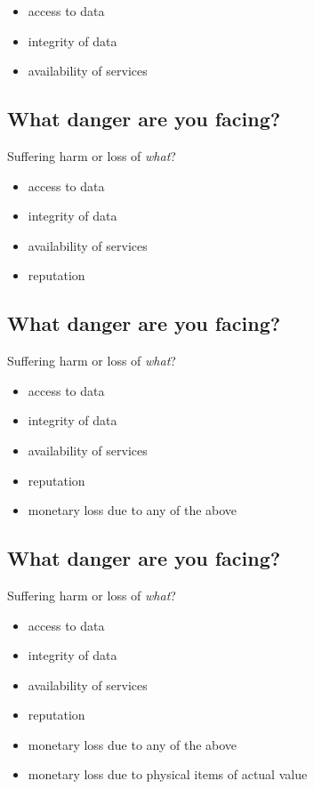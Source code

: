 \documentclass[xga]{xdvislides}
\begin{document}
\begin{itemize}
	\item access to data
	\item integrity of data
	\item availability of services
\end{itemize}

\subsection{What danger are you facing?}
Suffering harm or loss of {\em what}?

\begin{itemize}
	\item access to data
	\item integrity of data
	\item availability of services
	\item reputation
\end{itemize}

\subsection{What danger are you facing?}
Suffering harm or loss of {\em what}?

\begin{itemize}
	\item access to data
	\item integrity of data
	\item availability of services
	\item reputation
	\item monetary loss due to any of the above
\end{itemize}

\subsection{What danger are you facing?}
Suffering harm or loss of {\em what}?

\begin{itemize}
	\item access to data
	\item integrity of data
	\item availability of services
	\item reputation
	\item monetary loss due to any of the above
	\item monetary loss due to physical items of actual value
\end{itemize}
\end{document}
